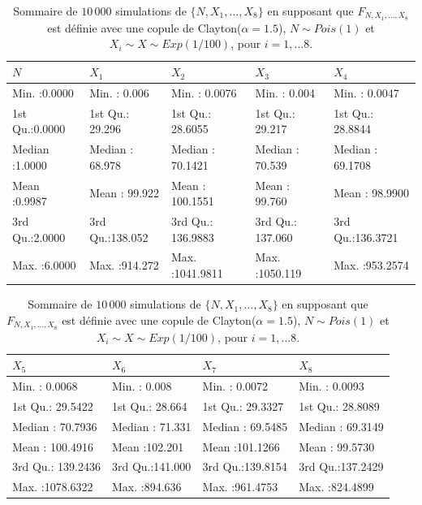 \documentclass{article}
\begin{document}
		\begin{table}[H]
			\centering
			\begin{tabular}{lllll}
				\hline
				       $N$ &      $X_1$ &      $X_2$ &       $X_3$ &       $X_4$ \\
				\hline
				  Min.   :0.0000   & Min.   :  0.006   & Min.   :   0.0076   & Min.   :   0.004   & Min.   :  0.0047      \\ 
				  1st Qu.:0.0000   & 1st Qu.: 29.296   & 1st Qu.:  28.6055   & 1st Qu.:  29.217   & 1st Qu.: 28.8844      \\ 
				  Median :1.0000   & Median : 68.978   & Median :  70.1421   & Median :  70.539   & Median : 69.1708      \\ 
				  Mean   :0.9987   & Mean   : 99.922   & Mean   : 100.1551   & Mean   :  99.760   & Mean   : 98.9900      \\ 
				  3rd Qu.:2.0000   & 3rd Qu.:138.052   & 3rd Qu.: 136.9883   & 3rd Qu.: 137.060   & 3rd Qu.:136.3721      \\ 
				  Max.   :6.0000   & Max.   :914.272   & Max.   :1041.9811   & Max.   :1050.119   & Max.   :953.2574      \\ 
				 \hline
			\end{tabular}
	
			\begin{tabular}{llll}
				\hline
				$X_5$ &      $X_6$ &       $X_7$ &       $X_8$ \\ 
				\hline
				 Min.   :   0.0068   & Min.   :  0.008   & Min.   :  0.0072   & Min.   :  0.0093   \\ 
				 1st Qu.:  29.5422   & 1st Qu.: 28.664   & 1st Qu.: 29.3327   & 1st Qu.: 28.8089   \\ 
				 Median :  70.7936   & Median : 71.331   & Median : 69.5485   & Median : 69.3149   \\ 
				 Mean   : 100.4916   & Mean   :102.201   & Mean   :101.1266   & Mean   : 99.5730   \\ 
				 3rd Qu.: 139.2436   & 3rd Qu.:141.000   & 3rd Qu.:139.8154   & 3rd Qu.:137.2429   \\ 
				 Max.   :1078.6322   & Max.   :894.636   & Max.   :961.4753   & Max.   :824.4899   \\ 
				\hline
		\end{tabular}
		\caption[Sommaire des données simulées pour le scénario \ref{scenario_Clayton_Pois}]{Sommaire de $10\,000$ simulations de $\{N, X_1, \dots, X_8\}$ en supposant que $F_{N,X_1,\dots, X_8}$ est définie avec une copule de Clayton($\alpha=1.5$), $N \sim Pois(1)$ et $X_i \sim X \sim Exp(1/100)$, pour $i=1,\dots 8$.}\label{tbl_sommaire_Clayton_Pois_1}
		\end{table}
		
\end{document}
